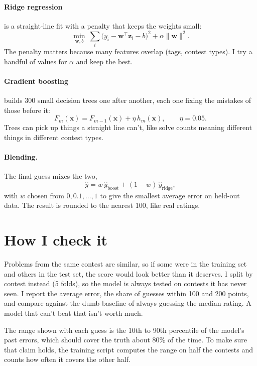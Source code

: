 \documentclass[11pt,a4paper]{article}
\begin{document}
\paragraph{Ridge regression} is a straight-line fit with a penalty that keeps the weights small:
\begin{equation}
\min_{\mathbf{w},b}\ \sum_i \bigl(y_i-\mathbf{w}^{\top}\mathbf{z}_i-b\bigr)^2+\alpha\lVert\mathbf{w}\rVert^2 .
\end{equation}
The penalty matters because many features overlap (tags, contest types). I try a handful of values for $\alpha$ and keep the best.

\paragraph{Gradient boosting} builds 300 small decision trees one after another, each one fixing the mistakes of those before it:
\begin{equation}
F_m(\mathbf{x})=F_{m-1}(\mathbf{x})+\eta\,h_m(\mathbf{x}),\qquad \eta=0.05 .
\end{equation}
Trees can pick up things a straight line can't, like solve counts meaning different things in different contest types.

\paragraph{Blending.} The final guess mixes the two,
\begin{equation}
\hat y=w\,\hat y_{\text{boost}}+(1-w)\,\hat y_{\text{ridge}},
\end{equation}
with $w$ chosen from $0,0.1,\dots,1$ to give the smallest average error on held-out data. The result is rounded to the nearest 100, like real ratings.

\section{How I check it}

Problems from the same contest are similar, so if some were in the training set and others in the test set, the score would look better than it deserves. I split by contest instead (5 folds), so the model is always tested on contests it has never seen. I report the average error, the share of guesses within 100 and 200 points, and compare against the dumb baseline of always guessing the median rating. A model that can't beat that isn't worth much.

The range shown with each guess is the 10th to 90th percentile of the model's past errors, which should cover the truth about 80\% of the time. To make sure that claim holds, the training script computes the range on half the contests and counts how often it covers the other half.
\end{document}
